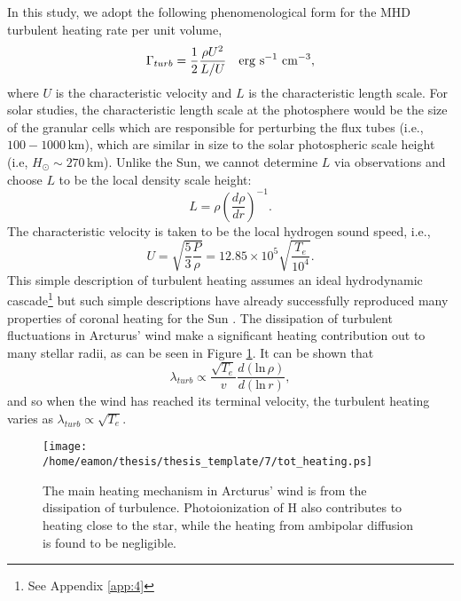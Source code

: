 In this study, we adopt the following phenomenological form for the MHD turbulent heating rate per unit volume,
\begin{equation}
\Gamma_{turb} =\frac{1}{2}\frac{\rho U^{2}}{L/U}\ \ \ \rm{erg \ s^{-1} \ cm^{-3}},
\end{equation} 
where $U$ is the characteristic velocity and $L$ is the characteristic length scale. For solar studies, the characteristic length scale at the photosphere would be the size of the granular cells which are responsible for perturbing the flux tubes (i.e., $100-1000$\,km), which are similar in size to the solar photospheric scale height (i.e, $H_{\odot} \sim 270$\,km). Unlike the Sun, we cannot determine $L$ via observations and choose $L$ to be the local density scale height:
\begin{equation}
L = \rho \left(\dfrac{d\rho}{dr} \right)^{-1}.
\end{equation}
The characteristic velocity is taken to be the local hydrogen sound speed, i.e., 
\begin{equation}
U=\sqrt{\frac{5}{3}\dfrac{P}{\rho}}=12.85\times 10^{5}\sqrt{\frac{T_{e}}{10^4}}.
\end{equation}
This simple description of turbulent heating assumes an ideal \cite{kolmogorov_1941} hydrodynamic cascade\footnote{See Appendix \ref{app:4}} but such simple descriptions have already successfully reproduced many properties of coronal heating for the Sun \citep{cranmer_2012}. The dissipation of turbulent fluctuations in Arcturus' wind make a significant heating contribution out to many stellar radii, as can be seen in Figure \ref{fig:7.5}. It can be shown that 
\begin{equation}
\lambda_{turb} \propto \frac{\sqrt{T_e}}{v}\frac{d(\mathrm{ln}\,\rho)}{d(\mathrm{ln}\,r)},
\end{equation} 
and so when the wind has reached its terminal velocity, the turbulent heating varies as $\lambda_{turb} \propto \sqrt{T_e}$.

\begin{figure}[!ht]
\centering 
         \texttt{[image: /home/eamon/thesis/thesis\_template/7/tot\_heating.ps]}
\caption[Main heating mechanisms in Arcturus' wind]{The main heating mechanism in Arcturus' wind is from the dissipation of turbulence. Photoionization of H also contributes to heating close to the star, while the heating from ambipolar diffusion is found to be negligible.}
\label{fig:7.5}
\end{figure}

